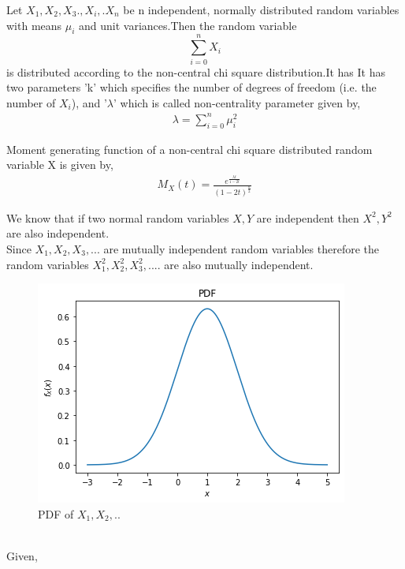 \documentclass[journal,12pt,twocolumn]{IEEEtran}
\begin{document}
\begin{definition}
Let $X_{1},X_{2},X_{3}.,X_{i},.X_{n}$ be n independent, normally distributed random variables with means $\mu_{i}$ and unit variances.Then the random variable
$$\sum_{i=0}^{n}X_{i}$$ is distributed according to the non-central chi square distribution.It has  It has two parameters 'k' which specifies the number of degrees of freedom (i.e. the number of $X_{i}$), and '$\lambda$' which is called non-centrality parameter given by,
\begin{align}
    \lambda=\sum_{i=0}^{n}\mu_{i}^2
\end{align}
\label{def-NCSD}
\end{definition}
\begin{lemma}
Moment generating function of a non-central chi square distributed random variable X is given by,
\begin{align}
    M_{X}(t)=\frac{e^{\frac{\lambda t}{1-2t}}}{(1-2t)^{\frac{n}{2}}}
\end{align}
\label{MGF}
\end{lemma}
We know that if two normal random variables $X,Y$ are independent then $X^2,Y^2$ are also independent.
\\Since $X_{1},X_{2},X_{3},...$ are mutually independent random variables therefore the random variables $X_{1}^{2},X_{2}^{2},X_{3}^{2},....$  are also mutually independent.
\begin{figure}[h]
 \centering
\includegraphics[width=\columnwidth]{PDF.png}
 \caption{PDF of $X_{1},X_{2},..$}
    \label{fig:my_label}
\end{figure}
\\Given,
\end{document}
